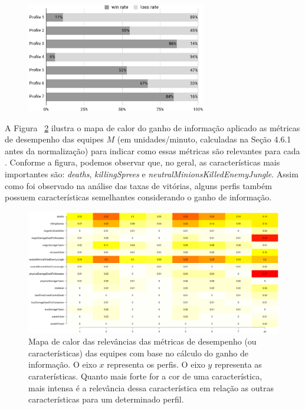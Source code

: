 \begin{figure}
  \centering
  \includegraphics[width=0.7\textwidth]{win-rate-plot}%
  \caption{
}
  \label{fig:win-plot}
\end{figure}

A Figura ~\ref{fig:relevance} ilustra o mapa de calor do ganho de informação aplicado as métricas de desempenho das equipes $M$ (em unidades/minuto, calculadas na Seção 4.6.1 antes da normalização) para indicar como essas métricas são relevantes para cada . Conforme a figura, podemos observar que, no geral, as características mais importantes são: \textit{deaths}, \textit{killingSprees} e \textit{neutralMinionsKilledEnemyJungle}. Assim como foi observado na análise das taxas de vitórias, alguns perfis também possuem características semelhantes considerando o ganho de informação.

\begin{figure}
\includegraphics[width=1\textwidth,height=\textheight,keepaspectratio]{relevance}
\caption{Mapa de calor das relevâncias das métricas de desempenho (ou características) das equipes com base no cálculo do ganho de informação. O eixo $x$ representa os perfis. O eixo $y$ representa as caraterísticas. Quanto mais forte for a cor de uma característica, mais intensa \'e a relevância dessa caracter\'istica em rela\c{c}\~ao as outras caracter\'isticas para um determinado perfil.}
\label{fig:relevance}
\end{figure}

